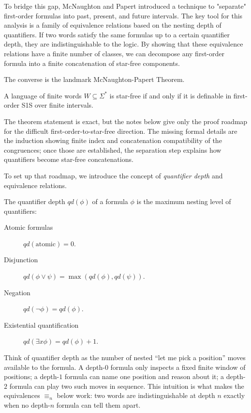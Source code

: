 To bridge this gap, McNaughton and Papert introduced a technique to "separate" first-order formulas into past, present, and future intervals. The key tool for this analysis is a family of equivalence relations based on the nesting depth of quantifiers. If two words satisfy the same formulas up to a certain quantifier depth, they are indistinguishable to the logic. By showing that these equivalence relations have a finite number of classes, we can decompose any first-order formula into a finite concatenation of star-free components.

The converse is the landmark McNaughton-Papert Theorem.

\begin{theorem}
A language of finite words $W \subseteq \Sigma^*$ is star-free if and only if it is definable in first-order S1S over finite intervals.
\end{theorem}

The theorem statement is exact, but the notes below give only the proof roadmap for the difficult first-order-to-star-free direction. The missing formal details are the induction showing finite index and concatenation compatibility of the congruences; once those are established, the separation step explains how quantifiers become star-free concatenations.

To set up that roadmap, we introduce the concept of \emph{quantifier depth} and equivalence relations.

\begin{definition}
The quantifier depth $qd(\phi)$ of a formula $\phi$ is the maximum nesting level of quantifiers:
\begin{description}
    \item[Atomic formulas] $qd(\text{atomic}) = 0$.
    \item[Disjunction] $qd(\phi \lor \psi) = \max(qd(\phi), qd(\psi))$.
    \item[Negation] $qd(\neg \phi) = qd(\phi)$.
    \item[Existential quantification] $qd(\exists x \phi) = qd(\phi) + 1$.
\end{description}
\end{definition}

Think of quantifier depth as the number of nested ``let me pick a position'' moves available to the formula. A depth-$0$ formula only inspects a fixed finite window of positions; a depth-$1$ formula can name one position and reason about it; a depth-$2$ formula can play two such moves in sequence. This intuition is what makes the equivalences $\equiv_n$ below work: two words are indistinguishable at depth $n$ exactly when no depth-$n$ formula can tell them apart.

